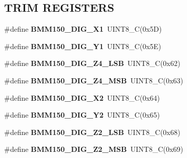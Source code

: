 \subsection*{T\+R\+IM R\+E\+G\+I\+S\+T\+E\+RS}
\begin{DoxyCompactItemize}
\item 
\mbox{\label{group___b_m_m150_ga6f4842863a3a45a1dda8aeab5380a704}} 
\#define {\bfseries B\+M\+M150\+\_\+\+D\+I\+G\+\_\+\+X1}~U\+I\+N\+T8\+\_\+C(0x5\+D)
\item 
\mbox{\label{group___b_m_m150_ga76d7f35a931f9f71e39ed60e13a9d5e4}} 
\#define {\bfseries B\+M\+M150\+\_\+\+D\+I\+G\+\_\+\+Y1}~U\+I\+N\+T8\+\_\+C(0x5\+E)
\item 
\mbox{\label{group___b_m_m150_ga90c5e736eab103bb8298afe5ceff3142}} 
\#define {\bfseries B\+M\+M150\+\_\+\+D\+I\+G\+\_\+\+Z4\+\_\+\+L\+SB}~U\+I\+N\+T8\+\_\+C(0x62)
\item 
\mbox{\label{group___b_m_m150_gab2d62243fc52243237e257c184e0ff3f}} 
\#define {\bfseries B\+M\+M150\+\_\+\+D\+I\+G\+\_\+\+Z4\+\_\+\+M\+SB}~U\+I\+N\+T8\+\_\+C(0x63)
\item 
\mbox{\label{group___b_m_m150_ga321605f1e28728eb836756584f18a5c3}} 
\#define {\bfseries B\+M\+M150\+\_\+\+D\+I\+G\+\_\+\+X2}~U\+I\+N\+T8\+\_\+C(0x64)
\item 
\mbox{\label{group___b_m_m150_gad48401100ea30b4fe0751f83d3596e57}} 
\#define {\bfseries B\+M\+M150\+\_\+\+D\+I\+G\+\_\+\+Y2}~U\+I\+N\+T8\+\_\+C(0x65)
\item 
\mbox{\label{group___b_m_m150_gaf5e2f18c796516955708266a654224f0}} 
\#define {\bfseries B\+M\+M150\+\_\+\+D\+I\+G\+\_\+\+Z2\+\_\+\+L\+SB}~U\+I\+N\+T8\+\_\+C(0x68)
\item 
\mbox{\label{group___b_m_m150_gabfd26fc351558a45693119519e14ca7a}} 
\#define {\bfseries B\+M\+M150\+\_\+\+D\+I\+G\+\_\+\+Z2\+\_\+\+M\+SB}~U\+I\+N\+T8\+\_\+C(0x69)
\item 
\mbox{\label{group___b_m_m150_ga4b86d52b09ddfdba715a35c3f8e77f2f}} 

\end{DoxyCompactItemize}
